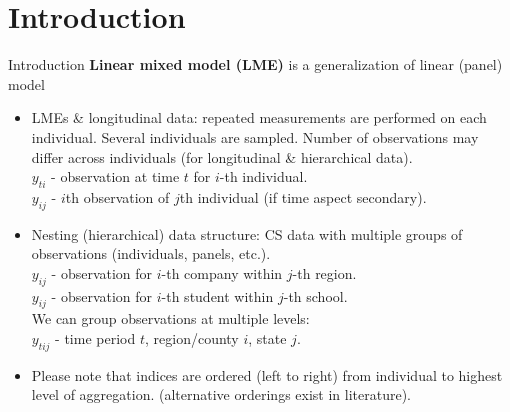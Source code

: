 \documentclass{beamer}
\begin{document}
\section{Introduction}
\begin{frame}{Introduction}
\small 
\textbf{Linear mixed model (LME)} is a generalization of linear (panel) model
\medskip
\begin{itemize}
\item LMEs \& longitudinal data: repeated measurements are performed on each individual. Several individuals are sampled. Number of observations may differ across individuals (for longitudinal \& hierarchical data).\\ \smallskip
\quad $y_{ti}$ - observation at time $t$ for $i$-th individual. \\  
\quad $y_{ij}$ - $i$th observation of $j$th individual (if time aspect secondary). \\ 
\bigskip
\item Nesting (hierarchical) data structure: CS data with multiple groups of observations (individuals, panels, etc.). \\ \smallskip
\quad $y_{ij}$ - observation for $i$-th company within $j$-th region. \\ 
\quad $y_{ij}$ - observation for $i$-th student within $j$-th school. \\ 
\medskip
We can group observations at multiple levels:\\
\smallskip
\quad $y_{tij}$ - time period $t$, region/county $i$, state $j$.\\ 
\bigskip
\item Please note that indices are ordered (left to right) from individual to highest level of aggregation. (alternative orderings exist in literature).
\end{itemize}
\end{frame}
\end{document}

